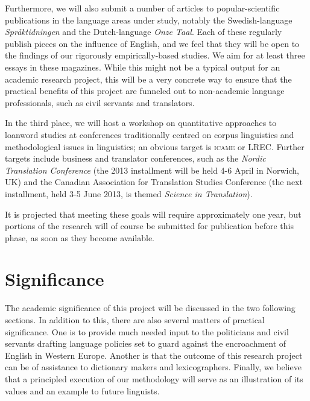 \documentclass[a4paper]{article}
\begin{document}
Furthermore, we will also submit a number of articles to popular-scientific publications in the language areas under study, notably the Swedish-language \emph{Spr\aa ktidningen} and the Dutch-language \emph{Onze Taal}.
Each of these regularly publish pieces on the influence of English, and we feel that they will be open to the findings of our rigorously empirically-based studies. We aim for at least three essays in these magazines. While this might not be a typical output for an academic research project, this will be a very concrete way to ensure that the practical benefits of this project are funneled out to non-academic language professionals, such as civil servants and translators.

In the third place, we will host a workshop on quantitative approaches to loanword studies at conferences traditionally centred on corpus linguistics and methodological issues in linguistics; an obvious target is \textsc{icame} or LREC. Further targets include business and translator conferences, such as the \emph{Nordic Translation Conference} (the 2013 installment will be held 4-6 April in Norwich, UK) and the Canadian Association for Translation Studies Conference (the next installment, held 3-5 June 2013, is themed \emph{Science in Translation}). 

It is projected that meeting these goals will require approximately one year, but portions of the research will of course be submitted for publication before this phase, as soon as they become available.



\section{Significance}
The academic significance of this project %
will be discussed in the two following sections. In addition to this, there are also several matters of  practical significance. One is to provide much needed input to the politicians and civil servants drafting language policies set to guard against the encroachment of English in Western Europe. Another is that the outcome of this research project can be of assistance to dictionary makers and lexicographers. Finally, we believe that a principled execution of our methodology will serve as an illustration of its values and an example to future linguists.
\end{document}
